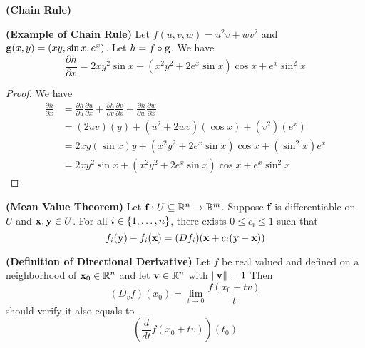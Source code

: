 \documentclass{report}
\begin{document}
\begin{theorem}
\label{4.2.10}
\textbf{(Chain Rule)}
\end{theorem}
\begin{theorem}
\label{4.2.11}
\textbf{(Example of Chain Rule)} Let $f(u,v,w)=u^2v+wv^2$ and $\textbf{g}(x,y)=(xy,\sin x,e^x)$. Let $h=f\circ \textbf{g}$. We have
\begin{equation}
\frac{\partial h}{\partial x}=2xy^2\sin x+(x^2y^2+2e^x\sin x) \cos x+ e^x\sin^2 x
\end{equation}
\end{theorem}
\begin{proof}
We have
\begin{align}
  \frac{\partial h}{\partial x}&=\frac{\partial h}{\partial u}\frac{\partial u}{\partial x}+\frac{\partial h}{\partial v}\frac{\partial v}{\partial x}+\frac{\partial h}{\partial w}\frac{\partial w}{\partial x}\\
  &=(2uv)(y)+(u^2+2wv)(\cos x)+(v^2)(e^x)\\
  &=2xy(\sin x)y+(x^2y^2+2e^x \sin x)\cos x+(\sin^2 x)e^x\\
  &=2xy^2\sin x+(x^2y^2+2e^x\sin x) \cos x+ e^x\sin^2 x
\end{align}
\end{proof}
\begin{theorem}
\label{4.2.12}
\textbf{(Mean Value Theorem)} Let $\textbf{f}:U\subseteq \mathbb{R}^n\rightarrow \mathbb{R}^m$. Suppose $\textbf{f}$ is differentiable on $U$ and $\textbf{x},\textbf{y}\in U$. For all $i\in \{ 1,\dots , n \}$, there exists $0\leq c_i\leq 1$ such that 
\begin{equation}
f_i(\textbf{y})-f_i(\textbf{x})=(Df_i)(\textbf{x}+c_i(\textbf{y}-\textbf{x}))
\end{equation}
\end{theorem}
\begin{definition}
\label{4.2.13}
  \textbf{(Definition of Directional Derivative)} Let $f$ be real valued and defined on a neighborhood of $\textbf{x}_0 \in\mathbb{R}^n$ and let $\textbf{v}\in\mathbb{R}^n$ with $\| \textbf{v} \|=1$ Then
  \begin{equation}
    (D_vf)(x_0)=\lim_{t\to 0}\frac{f(x_0+tv)}{t}
  \end{equation}
 should verify it also equals to
\begin{equation}
  (\frac{d}{dt}f(x_0+tv))(t_0)
\end{equation}
\end{definition}
\end{document}
